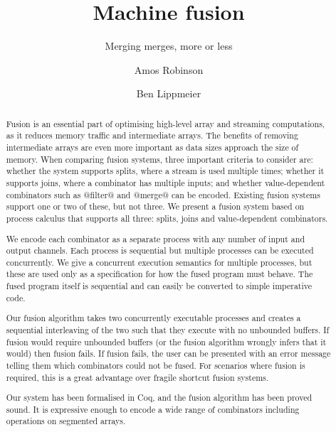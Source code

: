 \documentclass[acmlarge,review,anonymous]{acmart}\settopmatter{printfolios=true}
\begin{document}
\title{Machine fusion}
\subtitle{Merging merges, more or less}

\author{Amos Robinson}

\author{Ben Lippmeier}

\makeatactive
\begin{abstract}

Fusion is an essential part of optimising high-level array and streaming computations, as it reduces memory traffic and intermediate arrays.
The benefits of removing intermediate arrays are even more important as data sizes approach the size of memory.
When comparing fusion systems, three important criteria to consider are: whether the system supports splits, where a stream is used multiple times; whether it supports joins, where a combinator has multiple inputs; and whether value-dependent combinators such as @filter@ and @merge@ can be encoded.
Existing fusion systems support one or two of these, but not three.
We present a fusion system based on process calculus that supports all three: splits, joins and value-dependent combinators.

We encode each combinator as a separate process with any number of input and output channels.
Each process is sequential but multiple processes can be executed concurrently.
We give a concurrent execution semantics for multiple processes, but these are used only as a specification for how the fused program must behave.
The fused program itself is sequential and can easily be converted to simple imperative code.

Our fusion algorithm takes two concurrently executable processes and creates a sequential interleaving of the two such that they execute with no unbounded buffers.
If fusion would require unbounded buffers (or the fusion algorithm wrongly infers that it would) then fusion fails.
If fusion fails, the user can be presented with an error message telling them which combinators could not be fused.
For scenarios where fusion is required, this is a great advantage over fragile shortcut fusion systems.

Our system has been formalised in Coq, and the fusion algorithm has been proved sound.
It is expressive enough to encode a wide range of combinators including operations on segmented arrays.
\end{abstract}


\maketitle













\end{document}

